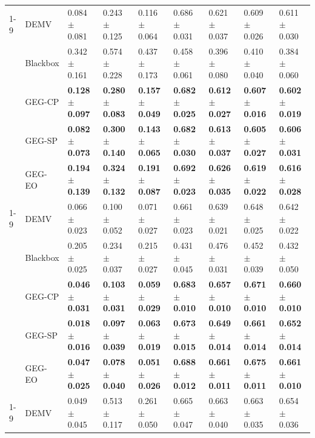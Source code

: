 \begin{table}
\begin{tabular}{lllllllll}
\cline{1-9}
\multirow[t]{5}{*}{drug} & DEMV & 0.084 $\pm$ 0.081 & 0.243 $\pm$ 0.125 & 0.116 $\pm$ 0.064 & 0.686 $\pm$ 0.031 & 0.621 $\pm$ 0.037 & 0.609 $\pm$ 0.026 & 0.611 $\pm$ 0.030 \\
 & Blackbox & 0.342 $\pm$ 0.161 & 0.574 $\pm$ 0.228 & 0.437 $\pm$ 0.173 & 0.458 $\pm$ 0.061 & 0.396 $\pm$ 0.080 & 0.410 $\pm$ 0.040 & 0.384 $\pm$ 0.060 \\
 & GEG-CP & \textbf{0.128 $\pm$ 0.097} & \textbf{0.280 $\pm$ 0.083} & \textbf{0.157 $\pm$ 0.049} & \textbf{0.682 $\pm$ 0.025} & \textbf{0.612 $\pm$ 0.027} & \textbf{0.607 $\pm$ 0.016} & \textbf{0.602 $\pm$ 0.019} \\
 & GEG-SP & \textbf{0.082 $\pm$ 0.073} & \textbf{0.300 $\pm$ 0.140} & \textbf{0.143 $\pm$ 0.065} & \textbf{0.682 $\pm$ 0.030} & \textbf{0.613 $\pm$ 0.037} & \textbf{0.605 $\pm$ 0.027} & \textbf{0.606 $\pm$ 0.031} \\
 & GEG-EO & \textbf{0.194 $\pm$ 0.139} & \textbf{0.324 $\pm$ 0.132} & \textbf{0.191 $\pm$ 0.087} & \textbf{0.692 $\pm$ 0.023} & \textbf{0.626 $\pm$ 0.035} & \textbf{0.619 $\pm$ 0.022} & \textbf{0.616 $\pm$ 0.028} \\
\cline{1-9}
\multirow[t]{5}{*}{law} & DEMV & 0.066 $\pm$ 0.023 & 0.100 $\pm$ 0.052 & 0.071 $\pm$ 0.027 & 0.661 $\pm$ 0.023 & 0.639 $\pm$ 0.021 & 0.648 $\pm$ 0.025 & 0.642 $\pm$ 0.022 \\
 & Blackbox & 0.205 $\pm$ 0.025 & 0.234 $\pm$ 0.037 & 0.215 $\pm$ 0.027 & 0.431 $\pm$ 0.045 & 0.476 $\pm$ 0.031 & 0.452 $\pm$ 0.039 & 0.432 $\pm$ 0.050 \\
 & GEG-CP & \textbf{0.046 $\pm$ 0.031} & \textbf{0.103 $\pm$ 0.031} & \textbf{0.059 $\pm$ 0.029} & \textbf{0.683 $\pm$ 0.010} & \textbf{0.657 $\pm$ 0.010} & \textbf{0.671 $\pm$ 0.010} & \textbf{0.660 $\pm$ 0.010} \\
 & GEG-SP & \textbf{0.018 $\pm$ 0.016} & \textbf{0.097 $\pm$ 0.039} & \textbf{0.063 $\pm$ 0.019} & \textbf{0.673 $\pm$ 0.015} & \textbf{0.649 $\pm$ 0.014} & \textbf{0.661 $\pm$ 0.014} & \textbf{0.652 $\pm$ 0.014} \\
 & GEG-EO & \textbf{0.047 $\pm$ 0.025} & \textbf{0.078 $\pm$ 0.040} & \textbf{0.051 $\pm$ 0.026} & \textbf{0.688 $\pm$ 0.012} & \textbf{0.661 $\pm$ 0.011} & \textbf{0.675 $\pm$ 0.011} & \textbf{0.661 $\pm$ 0.010} \\
\cline{1-9}
\multirow[t]{5}{*}{obesity} & DEMV & 0.049 $\pm$ 0.045 & 0.513 $\pm$ 0.117 & 0.261 $\pm$ 0.050 & 0.665 $\pm$ 0.047 & 0.663 $\pm$ 0.040 & 0.663 $\pm$ 0.035 & 0.654 $\pm$ 0.036 \\

\end{tabular}
\end{table}

